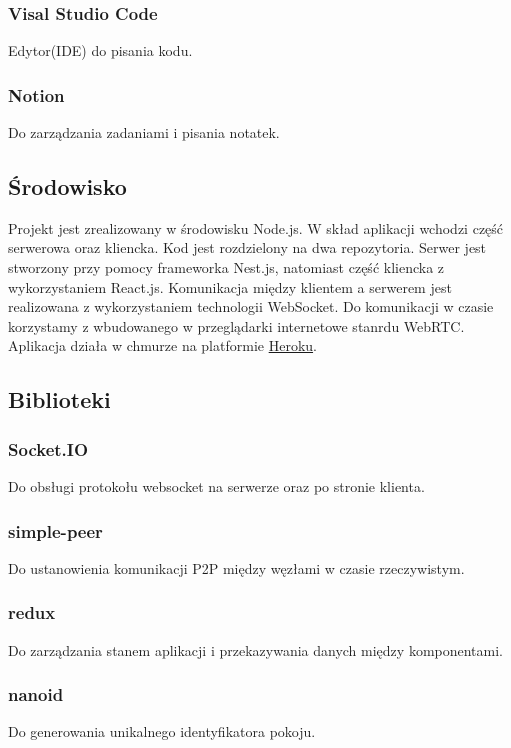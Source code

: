 \documentclass{article}
\begin{document}
\subsubsection{Visal Studio Code}
Edytor(IDE) do pisania kodu.

\subsubsection{Notion}
Do zarządzania zadaniami i pisania notatek.

\subsection{Środowisko}
Projekt jest zrealizowany w środowisku Node.js. W skład aplikacji wchodzi część serwerowa oraz kliencka. Kod jest rozdzielony na dwa repozytoria. Serwer jest stworzony przy pomocy frameworka Nest.js, natomiast część kliencka z wykorzystaniem React.js. Komunikacja między klientem a serwerem jest realizowana z wykorzystaniem technologii WebSocket. Do komunikacji w czasie korzystamy z wbudowanego w przeglądarki internetowe stanrdu WebRTC. Aplikacja działa w chmurze na platformie \href{https://dashboard.heroku.com/apps}{Heroku}.

\subsection{Biblioteki}

\subsubsection{Socket.IO}
Do obsługi protokołu websocket na serwerze oraz po stronie klienta.

\subsubsection{simple-peer}
Do ustanowienia komunikacji P2P między węzłami w czasie rzeczywistym.

\subsubsection{redux}
Do zarządzania stanem aplikacji i przekazywania danych między komponentami.

\subsubsection{nanoid}
Do generowania unikalnego identyfikatora pokoju.
\end{document}
